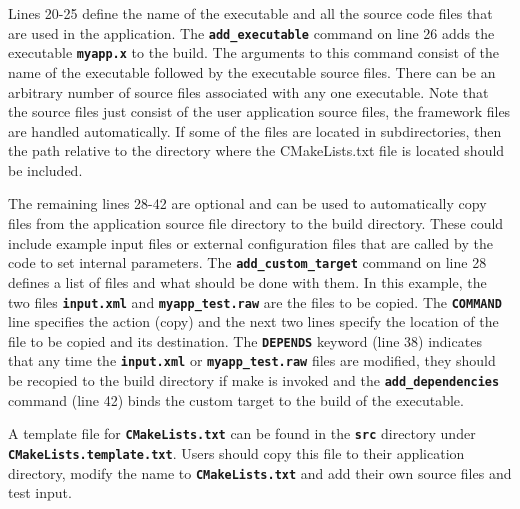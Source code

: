Lines 20-25 define the name of the executable and all the source code files that are used in the application. The \texttt{\textbf{add\_executable}} command on line 26 adds the executable \texttt{\textbf{myapp.x}} to the build. The arguments to this command consist of the name of the executable followed by the executable source files. There can be an arbitrary number of source files associated with any one executable. Note that the source files just consist of the user application source files, the framework files are handled automatically. If some of the files are located in subdirectories, then the path relative to the directory where the CMakeLists.txt file is located should be included.

The remaining lines 28-42 are optional and can be used to automatically copy files from the application source file directory to the build directory. These could include example input files or external configuration files that are called by the code to set internal parameters. The \texttt{\textbf{add\_custom\_target}} command on line 28 defines a list of files and what should be done with them. In this example, the two files \texttt{\textbf{input.xml}} and \texttt{\textbf{myapp\_test.raw}} are the files to be copied. The \texttt{\textbf{COMMAND}} line specifies the action (copy) and the next two lines specify the location of the file to be copied and its destination. The \texttt{\textbf{DEPENDS}} keyword (line 38) indicates that any time the \texttt{\textbf{input.xml}} or \texttt{\textbf{myapp\_test.raw}} files are modified, they should be recopied to the build directory if make is invoked and the \texttt{\textbf{add\_dependencies}} command (line 42) binds the custom target to the build of the executable.

A template file for \texttt{\textbf{CMakeLists.txt}} can be found in the \texttt{\textbf{src}} directory under \texttt{\textbf{CMakeLists.template.txt}}. Users should copy this file to their application directory, modify the name to \texttt{\textbf{CMakeLists.txt}} and add their own source files and test input.
\newline
\hyperlink{topDoc}{\color{blue}{Top}}
